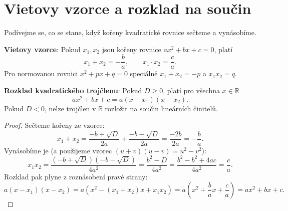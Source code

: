 \section{Vietovy vzorce a rozklad na součin}\label{sec:vietovy-vzorce}

Podívejme se, co se stane, když kořeny kvadratické rovnice sečteme a vynásobíme.

\begin{definitionbox}
  \textbf{Vietovy vzorce}: Pokud $x_1, x_2$ jsou kořeny rovnice $ax^2 + bx + c = 0$, platí
  \begin{equation*}
    x_1 + x_2 = -\frac{b}{a},\qquad x_1\cdot x_2 = \frac{c}{a}.
  \end{equation*}
  Pro normovanou rovnici $x^2 + px + q = 0$ speciálně $x_1 + x_2 = -p$ a $x_1x_2 = q$.

  \vspace{0.2cm}

  \textbf{Rozklad kvadratického trojčlenu}: Pokud $D\geq 0$, platí pro všechna $x\in\mathbb{R}$
  \begin{equation*}
    ax^2 + bx + c = a(x - x_1)(x - x_2).
  \end{equation*}
  Pokud $D < 0$, nelze trojčlen v $\mathbb{R}$ rozložit na součin lineárních činitelů.
\end{definitionbox}

\begin{proof}
  Sečteme kořeny ze vzorce:
  \begin{equation*}
    x_1 + x_2 = \frac{-b + \sqrt{D}}{2a} + \frac{-b - \sqrt{D}}{2a} = \frac{-2b}{2a} = -\frac{b}{a}.
  \end{equation*}
  Vynásobíme je (a použijeme vzorec $(u + v)(u - v) = u^2 - v^2$):
  \begin{equation*}
    x_1x_2 = \frac{(-b + \sqrt{D})(-b - \sqrt{D})}{4a^2} = \frac{b^2 - D}{4a^2} = \frac{b^2 - b^2 + 4ac}{4a^2} = \frac{c}{a}.
  \end{equation*}
  Rozklad pak plyne z roznásobení pravé strany:
  \begin{equation*}
    a(x - x_1)(x - x_2) = a\left(x^2 - (x_1 + x_2)x + x_1x_2\right) = a\left(x^2 + \frac{b}{a}x + \frac{c}{a}\right) = ax^2 + bx + c.
  \end{equation*}
\end{proof}


